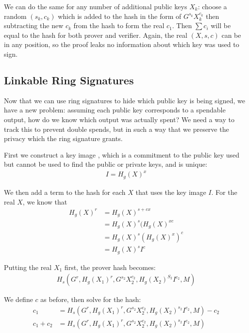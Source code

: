\documentclass{article}
\begin{document}
We can do the same for any number of additional public keys $X_k$: choose a random $(s_k,c_k)$ which is added to the hash in the form of $G^{s_k} X_k^{c_k}$ then subtracting the new $c_k$ from the hash to form the real $c_1$. Then $\sum c_i$ will be equal to the hash for both prover and verifier.  Again, the real $(X, s, c)$ can be in any position, so the proof leaks no information about which key was used to sign.


\subsection{Linkable Ring Signatures}

Now that we can use ring signatures to hide which public key is being signed, we have a new problem: assuming each public key corresponds to a spendable output, how do we know which output was actually spent?  We need a way to track this to prevent double spends, but in such a way that we preserve the privacy which the ring signature grants.

First we construct a key image \cite{cryptonote}, which is a commitment to the public key used but cannot be used to find the public or private keys, and is unique:
\begin{align}
  I = H_g(X)^x
\end{align}

We then add a term to the hash for each $X$ that uses the key image $I$.  For the real $X$, we know that
\begin{align}
  H_g(X)^r &= H_g(X)^{s + cx}\nonumber\\
         &= H_g(X)^s (H_g(X)^{xc}\nonumber\\
         &= H_g(X)^s (H_g(X)^x)^c\nonumber\\
         &= H_g(X)^s I^c\nonumber
\end{align}

Putting the real $X_1$ first, the prover hash becomes:
\begin{align}
  H_s(G^r, H_g(X_1)^r, G^{s_2} X_2^{c_2}, H_g(X_2)^{S_2} I^{c_2}, M)
\end{align}

We define $c$ as before, then solve for the hash:
\begin{align}
  c_1 &= H_s(G^r, H_g(X_1)^r, G^{s_2} X_2^{c_2}, H_g(X_2)^{s_2} I^{c_2}, M) - c_2 \nonumber \\
  c_1 + c_2 &= H_s(G^r, H_g(X_1)^r, G^{s_2} X_2^{c_2}, H_g(X_2)^{s_2} I^{c_2}, M)\nonumber
\end{align}
\end{document}
